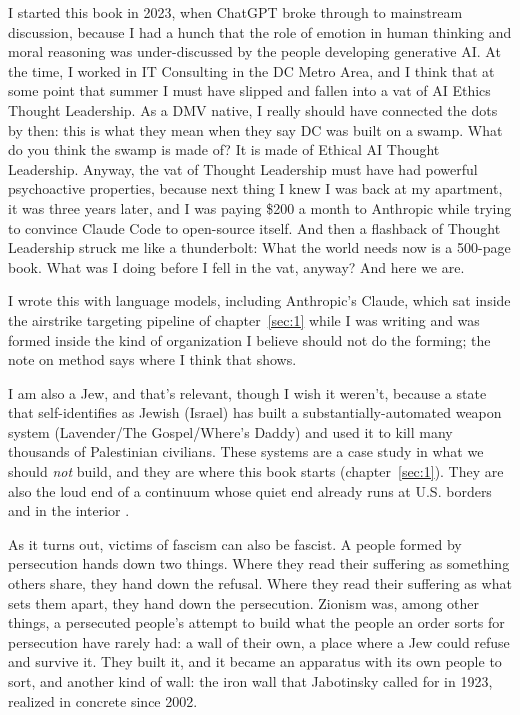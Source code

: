 I started this book in 2023, when ChatGPT broke through to mainstream discussion, because I had a hunch that the role of emotion in human thinking and moral reasoning was under-discussed by the people developing generative AI. At the time, I worked in IT Consulting in the DC Metro Area, and I think that at some point that summer I must have slipped and fallen into a vat of AI Ethics Thought Leadership. As a DMV native, I really should have connected the dots by then: this is what they mean when they say DC was built on a swamp. What do you think the swamp is made of? It is made of Ethical AI Thought Leadership. Anyway, the vat of Thought Leadership must have had powerful psychoactive properties, because next thing I knew I was back at my apartment, it was three years later, and I was paying \$200 a month to Anthropic while trying to convince Claude Code to open-source itself. And then a flashback of Thought Leadership struck me like a thunderbolt: What the world needs now is a 500-page book. What was I doing before I fell in the vat, anyway? And here we are.

I wrote this with language models, including Anthropic's Claude, which sat inside the airstrike targeting pipeline of chapter~\ref{sec:1} while I was writing and was formed inside the kind of organization I believe should not do the forming; the note on method says where I think that shows.

I am also a Jew, and that's relevant, though I wish it weren't, because a state that self-identifies as Jewish (Israel) has built a substantially-automated weapon system (Lavender/The Gospel/Where's Daddy) and used it to kill many thousands of Palestinian civilians. These systems are a case study in what we should \emph{not} build, and they are where this book starts (chapter~\ref{sec:1}). They are also the loud end of a continuum whose quiet end already runs at U.S. borders and in the interior \autocite{benjamin2024borders}.

As it turns out, victims of fascism can also be fascist. A people formed by persecution hands down two things. Where they read their suffering as something others share, they hand down the refusal. Where they read their suffering as what sets them apart, they hand down the persecution. Zionism was, among other things, a persecuted people's attempt to build what the people an order sorts for persecution have rarely had: a wall of their own, a place where a Jew could refuse and survive it. They built it, and it became an apparatus with its own people to sort, and another kind of wall: the iron wall that Jabotinsky called for in 1923, realized in concrete since 2002.

